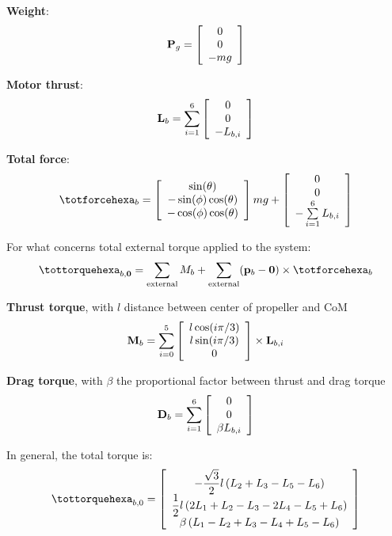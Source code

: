 \textbf{Weight}:
\begin{equation}
\mathbf{P}_g = \left[\begin{array}{c}0 \\ 0 \\ - m g\end{array}\right]
\end{equation}

\textbf{Motor thrust}:
\begin{equation}
\mathbf{L}_b = \sum\limits_{i=1}^6 \left[\begin{array}{c}0 \\ 0 \\ -L_{b,i}\end{array}\right]
\end{equation}

\textbf{Total force}:
\begin{equation}
\totforcehexa_b = \vettore{\sin(\theta) \\ -\sin(\phi)\cos(\theta) \\ - \cos(\phi)\cos(\theta)} m g + \vettore{ 0 \\ 0 \\ - \sum\limits_{i=1}^6 L_{b,i}}
\end{equation}

For what concerns total external torque applied to the system:
\begin{equation}
\tottorquehexa_{b,\mathbf{0}} = \sum\limits_{\mathrm{external}} M_b + \sum\limits_{\mathrm{external}} (\mathbf{p}_b - \mathbf{0}) \times \totforcehexa_b
\end{equation}

\textbf{Thrust torque}, with $l$ distance between center of propeller and CoM
\begin{equation}
\mathbf{M}_b = \sum\limits_{i=0}^5 \left[\begin{array}{c} l \cos(i \pi/3) \\ l \sin(i \pi /3) \\ 0 \end{array}\right] \times \mathbf{L}_{b,i}
\end{equation}

\textbf{Drag torque}, with $\beta$ the proportional factor between thrust and drag torque
\begin{equation}
\mathbf{D}_b = \sum\limits_{i=1}^6 \left[\begin{array}{c} 0 \\ 0 \\ \beta L_{b,i}\end{array}\right]
\end{equation}

In general, the total torque is:
\begin{equation}
\tottorquehexa_{b,0} = \left[ \begin{array}{c}
-\dfrac{\sqrt{3}}{2} l \left( L_2 +L_3 - L_5 - L_6 \right) \\
\dfrac{1}{2} l \left( 2 L_1 + L_2 -L_3 - 2 L_4 - L_5 + L_6 \right) \\ 
\beta \left( L_1 - L_2 + L_3 - L_4 + L_5 - L_6 \right)
\end{array}
\right]
\end{equation}

